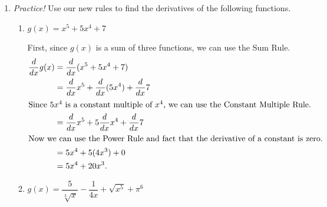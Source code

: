 \documentclass{article}
\begin{document}
\begin{enumerate}[resume]
\item  \label{differentiation-practice-1}

  \emph{Practice!} Use our new rules to find the derivatives of the following functions. 
  \begin{enumerate}
  \item \label{deriv-of-x^5+5x^4+7}
    \begin{problem}[0.15in]
      $g(x) = x^5 + 5x^4 + 7$
    \end{problem}

    \begin{solution}
      First, since $g(x)$ is a sum of three functions, we can use the Sum Rule.
      \begin{align*}
          \frac{d}{dx} g(x) &= \frac{d}{dx} (x^5 + 5x^4 + 7) \\
          &= \frac{d}{dx} x^5 + \frac{d}{dx} (5x^4) + \frac{d}{dx} 7 \\
          \intertext{Since $5x^4$ is a constant multiple of $x^4$, we can use the Constant
          Multiple Rule.}
          &= \frac{d}{dx} x^5 + 5\frac{d}{dx} x^4 + \frac{d}{dx} 7 \\
          \intertext{Now we can use the Power Rule and fact that the
          derivative of a constant is zero.}
          &= 5x^4 + 5(4x^3) + 0 \\
          &= 5x^4 + 20x^3.
      \end{align*}
    \end{solution}

  \item


    \begin{problem}[0.3in]
      $g(x) = \dfrac{5}{\sqrt[3]{x}} - \dfrac{1}{4x} + \sqrt{x^5} + \pi^6$
    \end{problem}


\end{enumerate}
\end{enumerate}
\end{document}
